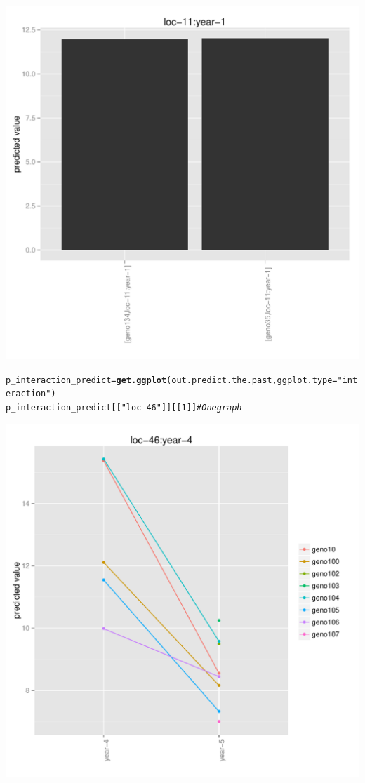 \documentclass{article}\usepackage[]{graphicx}\usepackage[]{color}
\makeatletter
\newcommand{\hlnum}[1]{\textcolor[rgb]{0.686,0.059,0.569}{#1}}%
\newcommand{\hlstr}[1]{\textcolor[rgb]{0.192,0.494,0.8}{#1}}%
\newcommand{\hlcom}[1]{\textcolor[rgb]{0.678,0.584,0.686}{\textit{#1}}}%
\newcommand{\hlstd}[1]{\textcolor[rgb]{0.345,0.345,0.345}{#1}}%
\newcommand{\hlkwb}[1]{\textcolor[rgb]{0.69,0.353,0.396}{#1}}%
\newcommand{\hlkwc}[1]{\textcolor[rgb]{0.333,0.667,0.333}{#1}}%
\newcommand{\hlkwd}[1]{\textcolor[rgb]{0.737,0.353,0.396}{\textbf{#1}}}%
\newenvironment{kframe}{%
 \def\at@end@of@kframe{}%
 \ifinner\ifhmode%
  \def\at@end@of@kframe{\end{minipage}}%
  \begin{minipage}{\columnwidth}%
 \fi\fi%
 \def\FrameCommand##1{\hskip\@totalleftmargin \hskip-\fboxsep
 \colorbox{shadecolor}{##1}\hskip-\fboxsep
     \hskip-\linewidth \hskip-\@totalleftmargin \hskip\columnwidth}%
 \MakeFramed {\advance\hsize-\width
   \@totalleftmargin\z@ \linewidth\hsize
   \@setminipage}}%
 {\par\unskip\endMakeFramed%
 \at@end@of@kframe}
\newenvironment{knitrout}{}{} %
\makeatother
\begin{document}
\begin{knitrout}
{\includegraphics[width=.6\textwidth]{figures/PPBstats_unnamed-chunk-49-5} 

}



\end{knitrout}

\begin{knitrout}
\color{fgcolor}\begin{kframe}
\begin{alltt}
\hlstd{p_interaction_predict} \hlkwb{=} \hlkwd{get.ggplot}\hlstd{(out.predict.the.past,} \hlkwc{ggplot.type} \hlstd{=} \hlstr{"interaction"}\hlstd{)}
\hlstd{p_interaction_predict[[}\hlstr{"loc-46"}\hlstd{]][[}\hlnum{1}\hlstd{]]} \hlcom{# One graph }
\end{alltt}
\end{kframe}

{\centering \includegraphics[width=.6\textwidth]{figures/PPBstats_unnamed-chunk-50-1} 

}



\end{knitrout}
\end{document}

